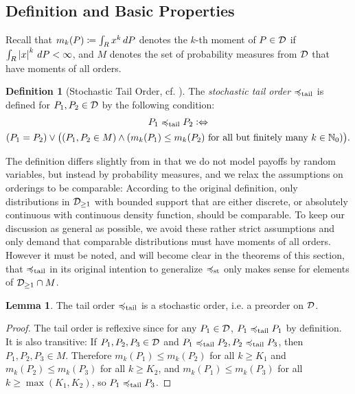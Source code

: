 \documentclass[a4paper,DIV=11,abstracton,twoside=semi]{scrreprt}
\newcommand{\M}{M}
\theoremstyle{definition}
\newtheorem{lemma}[thm]{Lemma} %
\newtheorem{defn}[thm]{Definition} %
\begin{document}
    \subsection{Definition and Basic Properties}
    \label{subsec:tailOrderDefinitionAndBasicProperties}
    Recall that $m_k(P) \coloneqq \int_{R} x^k \, dP$ denotes the $k$-th moment of $P \in \mathcal{D}$ if $\int_{R} \left| x \right|^k \, dP < \infty$, and $M$ denotes the set of probability measures from $\mathcal{D}$ that have moments of all orders.
    \begin{defn}[{Stochastic Tail Order, cf. \cite[Definition 2]{bib:rassTotalOrderingOnLossDistributions}}]
        \label{def:stochasticTailOrder}
        The \emph{stochastic tail order} $\preccurlyeq_{\text{tail}}$ is defined for $P_1, P_2 \in \mathcal{D}$ by the following condition:
        \begin{multline*}
            P_1 \leqtail P_2 \colonlra \\
            (P_1 = P_2) \vee \bigpars{(P_1, P_2 \in \M) \wedge (m_k(P_1) \leq m_k(P_2) \text{ for all but finitely many $k \in \N_0$})}.
        \end{multline*}
    \end{defn}
    The definition differs slightly from \cite[Definition 2]{bib:rassTotalOrderingOnLossDistributions} in that we do not model payoffs by random variables, but instead by probability measures, and we relax the assumptions on orderings to be comparable:
    According to the original definition, only distributions in $\mathcal{D}_{\geq1}$ with bounded support that are either discrete, or absolutely continuous with continuous density function, should be comparable. To keep our discussion as general as possible, we avoid these rather strict assumptions and only demand that comparable distributions must have moments of all orders.
    However it must be noted, and will become clear in the theorems of this section, that $\preccurlyeq_{\text{tail}}$ in its original intention to generalize $\preccurlyeq_{\text{st}}$ only makes sense for elements of $\mathcal{D}_{\geq1} \cap M$.

    \begin{lemma}
        The tail order $\preccurlyeq_{\text{tail}}$ is a stochastic order, i.e. a preorder on $\mathcal{D}$.
    \end{lemma}
    \begin{proof}
        The tail order is reflexive since for any $P_1 \in \mathcal{D}$, $P_1 \preccurlyeq_{\text{tail}} P_1$ by definition.
        It is also transitive: If $P_1, P_2, P_3 \in \mathcal{D}$ and $P_1 \preccurlyeq_{\text{tail}} P_2, P_2 \preccurlyeq_{\text{tail}} P_3$, then $P_1, P_2, P_3 \in M$.        
        Therefore $m_k(P_1) \leq m_k(P_2)$ for all $k \geq K_1$ and $m_k(P_2) \leq m_k(P_3)$ for all $k \geq K_2$, and $m_k(P_1) \leq m_k(P_3)$ for all $k \geq \max(K_1, K_2)$, so $P_1 \preccurlyeq_{\text{tail}} P_3$.
    \end{proof}
    
\end{document}
